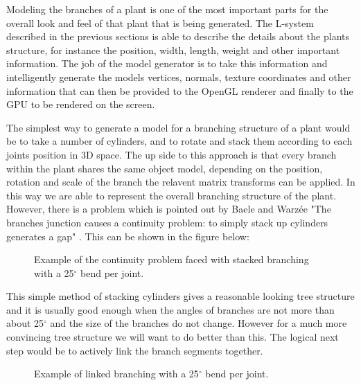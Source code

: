 Modeling the branches of a plant is one of the most important parts for the overall look and feel of that plant that is being generated. The L-system described in the previous sections is able to describe the details about the plants structure, for instance the position, width, length, weight and other important information. The job of the model generator is to take this information and intelligently generate the models vertices, normals, texture coordinates and other information that can then be provided to the OpenGL renderer and finally to the GPU to be rendered on the screen.

The simplest way to generate a model for a branching structure of a plant would be to take a number of cylinders, and to rotate and stack them according to each joints position in 3D space. The up side to this approach is that every branch within the plant shares the same object model, depending on the position, rotation and scale of the branch the relavent matrix transforms can be applied. In this way we are able to represent the overall branching structure of the plant. However, there is a problem which is pointed out by Baele and Warz\'{e}e "The branches junction causes a continuity problem: to simply stack up cylinders generates a gap" \cite{baele2005real}. This can be shown in the figure below:

\FloatBarrier

\begin{figure}[htbp]
	{\centering
		\vspace{7px}
		\setlength{\fboxrule}{1pt}
		\caption{Example of the continuity problem faced with stacked branching with a 25$^{\circ}$ bend per joint.}
	}
\end{figure}

\FloatBarrier

This simple method of stacking cylinders gives a reasonable looking tree structure and it is usually good enough when the angles of branches are not more than about 25$^{\circ}$ and the size of the branches do not change. However for a much more convincing tree structure we will want to do better than this. The logical next step would be to actively link the branch segments together.

\begin{figure}[htbp]
	{\centering
		\vspace{7px}
		\setlength{\fboxrule}{1pt}
		\caption{Example of linked branching with a 25$^{\circ}$ bend per joint.}
	}
\end{figure}
\FloatBarrier

